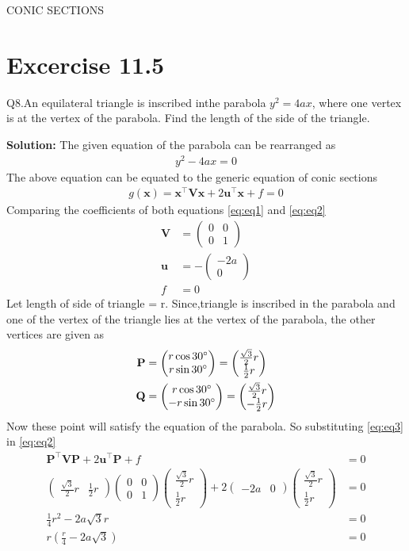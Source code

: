 \documentclass[12pt]{article}
\providecommand{\brak}[1]{\ensuremath{\left(#1\right)}}
\newcommand{\solution}{\noindent \textbf{Solution: }}
\newcommand{\myvec}[1]{\ensuremath{\begin{pmatrix}#1\end{pmatrix}}}
\let\vec\mathbf
\begin{document}
\begin{center}
\textbf\large{CONIC SECTIONS}

\end{center}
\section*{Excercise 11.5}
Q8.An equilateral triangle is inscribed inthe parabola $y^2 = 4ax$, where one vertex is at the vertex of the parabola. Find the length of the side of the triangle.

\solution
The given equation of the parabola can be rearranged as
\begin{align}
	\label{eq:eq1}
	y^2-4ax=0
\end{align}
The above equation can be equated to the generic equation of conic sections
\begin{align}
	\label{eq:eq2}
	g\brak{\vec{x}}=\vec{x}^\top \vec{V}\vec{x}+2\vec{u}^\top \vec{x}+f=0
\end{align}
Comparing the coefficients of both equations \eqref{eq:eq1} and \eqref{eq:eq2}
\begin{align}
	\label{eq:eqV}
	\vec{V} &= \myvec{0&0\\0&1}\\
	\label{eq:eqU}
	\vec{u} &= -\myvec{-2a\\0}\\
	\label{eq:eqF}
	f &= 0
\end{align}
Let length of side of triangle = r.
Since,triangle is inscribed in the parabola and one of the vertex of the triangle lies at the vertex of the parabola, the other vertices are given as
\begin{align}
	\label{eq:eq3}
	\vec{P} &= \myvec{r\cos 30\degree\\r\sin 30\degree} = \myvec{\frac{\sqrt{3}}{2}r\\\frac{1}{2}r}\\
	\vec{Q} &= \myvec{r\cos 30\degree\\-r\sin 30\degree} = \myvec{\frac{\sqrt{3}}{2}r\\-\frac{1}{2}r}
\end{align}
Now these point will satisfy the equation of the parabola. So substituting \eqref{eq:eq3} in \eqref{eq:eq2}
\begin{align}
	\vec{P}^\top \vec{V}\vec{P}+2\vec{u}^\top \vec{P}+f&=0\\
	\myvec{\frac{\sqrt{3}}{2}r&\frac{1}{2}r}\myvec{0&0\\0&1}\myvec{\frac{\sqrt{3}}{2}r\\\frac{1}{2}r}+2\myvec{-2a&0}\myvec{\frac{\sqrt{3}}{2}r\\\frac{1}{2}r} &= 0\\
	\frac{1}{4}r^2 - 2a\sqrt{3}r &= 0\\
	r\brak{\frac{r}{4} - 2a\sqrt{3}} &= 0
\end{align}
\end{document}
